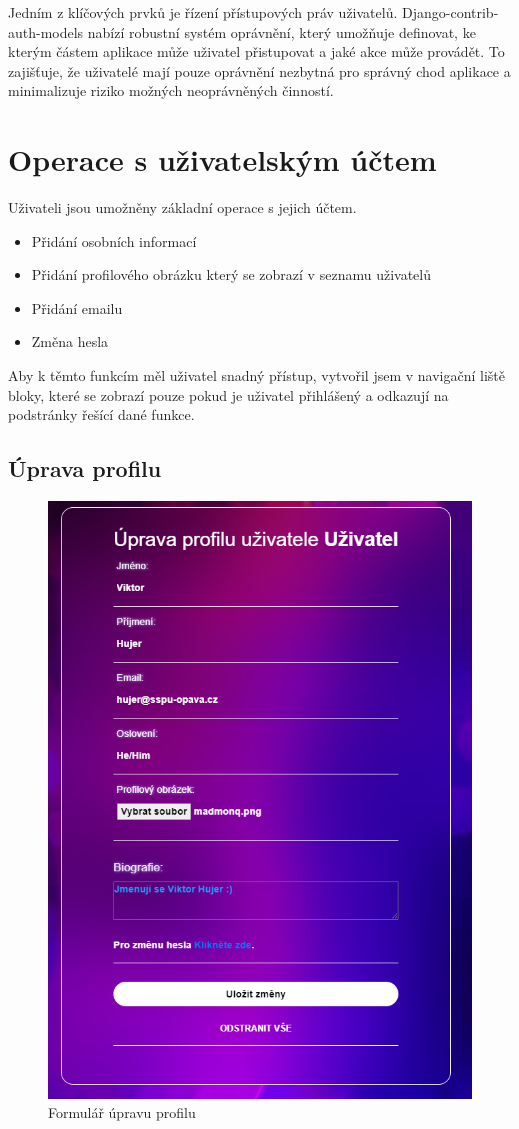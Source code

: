 \documentclass[12pt, a4paper,
oneside,      %
openright
]{report}
\begin{document}
Jedním z klíčových prvků je řízení přístupových práv uživatelů. Django-contrib-auth-models nabízí robustní systém oprávnění, který umožňuje definovat, ke kterým částem aplikace může uživatel přistupovat a jaké akce může provádět. To zajišťuje, že uživatelé mají pouze oprávnění nezbytná pro správný chod aplikace a minimalizuje riziko možných neoprávněných činností.
		
		\clearpage	
	\section[Operace s uživatelským účtem]{Operace s uživatelským účtem}
Uživateli jsou umožněny základní operace s jejich účtem.	
\begin{itemize}[label=\(\bullet\)]
  \item Přidání osobních informací
  \item Přidání profilového obrázku který se zobrazí v seznamu uživatelů
  \item Přidání emailu
  \item Změna hesla
\end{itemize}	
Aby k těmto funkcím měl uživatel snadný přístup, vytvořil jsem v navigační liště bloky, které se zobrazí pouze pokud je uživatel přihlášený a odkazují na podstránky řešící dané funkce.
\subsection[Úprava profilu]{Úprava profilu}
\begin{figure}[h]
			\centering
			\includegraphics[width=0.5\linewidth]{image/profile.png} 
			\caption{Formulář úpravu profilu}
		\end{figure}
		
\end{document}
